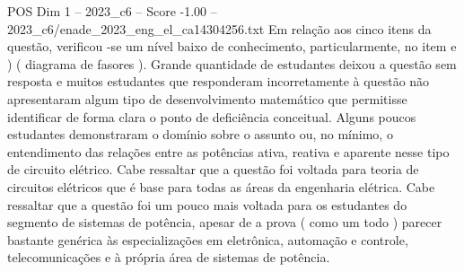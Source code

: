 \begin{textsample}{POS Dim 1 – 2023\_c6 – Score -1.00 – 2023\_c6/enade\_2023\_eng\_el\_ca14304256.txt}
Em relação aos cinco itens da questão, verificou -se um nível baixo de conhecimento, particularmente, no item e ) ( diagrama de fasores ).
Grande quantidade de estudantes deixou a questão sem resposta e muitos estudantes que responderam incorretamente à questão não apresentaram algum tipo de desenvolvimento matemático que permitisse identificar de forma clara o ponto de deficiência conceitual.
Alguns poucos estudantes demonstraram o domínio sobre o assunto ou, no mínimo, o entendimento das relações entre as potências ativa, reativa e aparente nesse tipo de circuito elétrico.
Cabe ressaltar que a questão foi voltada para teoria de circuitos elétricos que é base para todas as áreas da engenharia elétrica.
Cabe ressaltar que a questão foi um pouco mais voltada para os estudantes do segmento de sistemas de potência, apesar de a prova ( como um todo ) parecer bastante genérica às especializações em eletrônica, automação e controle, telecomunicações e à própria área de sistemas de potência.

\end{textsample}
